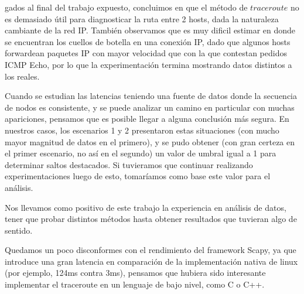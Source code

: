 gados al final del trabajo expuesto, concluimos en que el m\'etodo de $traceroute$ no es demasiado \'util para diagnosticar la ruta entre 2 hosts, dada la naturaleza cambiante de la red IP. Tambi\'en observamos que es muy dificil estimar en donde se encuentran los cuellos de botella en una conexi\'on IP, dado que algunos hosts forwardean paquetes IP con mayor velocidad que con la que contestan pedidos ICMP Echo, por lo que la experimentaci\'on termina mostrando datos distintos a los reales. 

\par Cuando se estudian las latencias teniendo una fuente de datos donde la secuencia de nodos es consistente, y se puede analizar un camino en particular con muchas apariciones, pensamos que es posible llegar a alguna conclusi\'on m\'as segura. En nuestros casos, los escenarios 1 y 2 presentaron estas situaciones (con mucho mayor magnitud de datos en el primero), y se pudo obtener (con gran certeza en el primer escenario, no as\'i en el segundo) un valor de umbral igual a 1 para determinar saltos destacados. Si tuvieramos que continuar realizando experimentaciones luego de esto, tomar\'iamos como base este valor para el an\'alisis.

\par Nos llevamos como positivo de este trabajo la experiencia en an\'alisis de datos, tener que probar distintos m\'etodos hasta obtener resultados que tuvieran algo de sentido. 

\par Quedamos un poco disconformes con el rendimiento del framework Scapy, ya que introduce una gran latencia en comparación de la implementaci\'on nativa de linux (por ejemplo, 124ms contra 3ms), pensamos que hubiera sido interesante implementar el traceroute en un lenguaje de bajo nivel, como C o C++. 